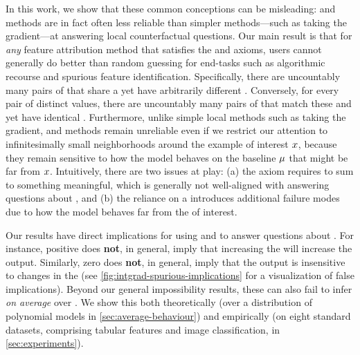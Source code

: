 %
%
%
%
%
%
%
%
%
%
%


%
%
%
%
%
%
%
%
%



%
%
%
%
%

In this work, we show that these common conceptions can be misleading: \completename{} and \additivename{} methods are in fact often less reliable than simpler methods---such as taking the gradient---at answering local counterfactual questions. 
Our main result is that for \emph{any} feature attribution method that satisfies the \completenames{} and \additivenames{} axioms, users cannot generally do better than random guessing for end-tasks such as algorithmic recourse and spurious feature identification. 
Specifically,
there are uncountably many pairs of \modelnames{} that share a \covname{} \attname{} yet have arbitrarily different \countmodbehaviourname{}.
Conversely, for every pair of distinct \covname{} \attname{} values, there are uncountably many pairs of \modelnames{} that match these \covname{} \attnames{} and yet have identical \countmodbehaviourname{}.
Furthermore, unlike simple local methods such as taking the gradient, \completename{} and \additivename{} methods remain unreliable even if we restrict our attention to infinitesimally small neighborhoods around the example of interest $x$, because they remain sensitive to how the model behaves on the baseline $\mu$ that might be far from $x$.
Intuitively, there are two issues at play: (a) the \completenames{} axiom requires \attnames{} to sum to something meaningful, which is generally not well-aligned with answering questions about \countmodbehaviourname{}, and (b) the reliance on a \basename{} introduces additional failure modes due to how the model behaves far from the \obsname{} of interest.
%
%


%
%
%
%
%
%


%
Our results have direct implications for using \completename{} and \additivename{} \methodnames{} 
%
to answer questions about \countmodbehaviourname{}. 
For instance, positive \covname{} \attname{} does \textbf{not}, in general, imply that increasing the \covname{} will increase the \modelname{} output. 
%
Similarly, zero \covname{} \attname{} does \textbf{not}, in general, imply that the \modelname{} output is insensitive to changes in the \covname{} (see \cref{fig:intgrad-spurious-implications} for a visualization of false implications).
Beyond our general impossibility results,
these \methodnames{} can also fail to infer \countmodbehaviourname{} \emph{on average} over \modelnames{}. 
%
%
We show this both theoretically (over a distribution of polynomial models in \cref{sec:average-behaviour}) 
and empirically (on eight standard datasets, comprising tabular features and image classification,
in \cref{sec:experiments}).


